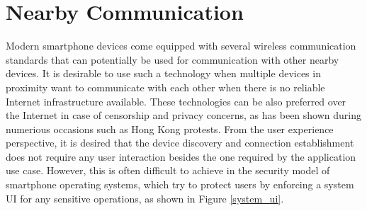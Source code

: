 \section{Nearby Communication}

Modern smartphone devices come equipped with several wireless communication standards that can potentially be used for communication with other nearby devices. It is desirable to use such a technology when multiple devices in proximity want to communicate with each other when there is no reliable Internet infrastructure available. These technologies can be also preferred over the Internet in case of censorship and privacy concerns, as has been shown during numerious occasions such as Hong Kong protests. From the user experience perspective, it is desired that the device discovery and connection establishment does not require any user interaction besides the one required by the application use case. However, this is often difficult to achieve in the security model of smartphone operating systems, which try to protect users by enforcing a system UI for any sensitive operations, as shown in Figure \ref{system_ui}.

